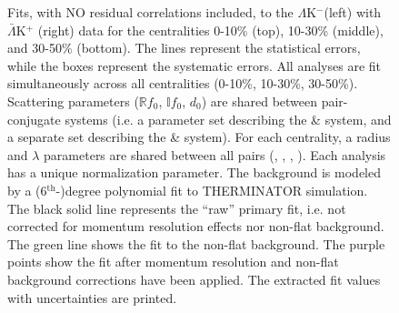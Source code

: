\documentclass[/home/jesse/Analysis/FemtoAnalysis/AnalysisNotes/AnalysisNoteJBuxton.tex]{subfiles}
\renewcommand{\NonFlatBgdLamKch}{_NonFlatBgdCrctnPolynomial}
\renewcommand{\ResNum}{_NoRes}
\renewcommand{\SaveNameModLamKch}{\MomRes\NonFlatBgdLamKch\ResNum\ParamFixAndShareLamKch}
\begin{document}
\begin{landscape}
\begin{figure}[h]
  \centering
  \caption[$\Lambda$K$^{-}$($\bar{\Lambda}$K$^{+}$) Fits with No Residuals]{Fits, with NO residual correlations included, to the $\Lambda$K$^{-}$(left) with $\bar{\Lambda}$K$^{+}$ (right) data for the centralities 0-10\% (top), 10-30\% (middle), and 30-50\% (bottom).
 The lines represent the statistical errors, while the boxes represent the systematic errors.  
 All \LamKpm analyses are fit simultaneously across all centralities (0-10\%, 10-30\%, 30-50\%).
 Scattering parameters ($\mathbb{R}f_{0}$, $\mathbb{I}f_{0}$, $d_{0}$) are shared between pair-conjugate systems (i.e. a parameter set describing the \LamKchP \& \ALamKchM system, and a separate set describing the \LamKchM \& \ALamKchP system).
 For each centrality, a radius and $\lambda$ parameters are shared between all pairs (\LamKchP, \ALamKchM, \LamKchM, \ALamKchP).
 Each analysis has a unique normalization parameter.
 The background is modeled by a (6$^{\mathrm{th}}$-)degree polynomial fit to THERMINATOR simulation.
 The black solid line represents the ``raw'' primary fit, i.e. not corrected for momentum resolution effects nor non-flat background.  
 The green line shows the fit to the non-flat background.
 The purple points show the fit after momentum resolution and non-flat background corrections have been applied.
 The extracted fit values with uncertainties are printed.}
  \label{fig:LamKchMwConjFits_NoRes}
\end{figure}

\end{landscape}
\pagestyle{plain}




 



\clearpage
\end{document}
